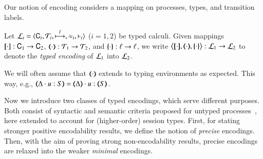 \noi Our notion of encoding considers a mapping on processes, 
types, and transition labels.  

\begin{definition}\rm
        Let  $\mathcal{L}_i=\langle \mathsf{C}_i, {\cal{T}}_i, \stackrel{\ell}{\longmapsto}, \approx_i, \vdash_i \rangle$
        ($i=1,2$) be typed calculi. 
	Given mappings $[\!\![\cdot]\!\!]: \mathsf{C}_1 \to \mathsf{C}_2$, 
	$(\!\!\langle\cdot\rangle\!\!): {\cal{T}}_1 \to {\cal{T}}_2$, and 
	$\{\!\!\{\cdot\}\!\!\}: \ell \to \ell$, 
	we write 
	$\enco{\map{\cdot}, \mapt{\cdot}, \mapa{\cdot}} : \tyl{L}_1 \to \tyl{L}_2$ to denote the \emph{typed encoding} of $\mathcal{L}_1$ into $\mathcal{L}_2$.
\end{definition}

\smallskip 


%


\noi We will often assume that  $(\!\!\langle\cdot\rangle\!\!)$ extends to typing
environments as expected. This way, e.g., $\mapt{\Delta \cat u:S} = \mapt{\Delta} \cat u:\mapt{S}$.

Now we introduce two classes of typed encodings, which 
serve different purposes. Both  consist of syntactic and semantic criteria 
proposed for untyped processes~\cite{Palamidessi03,DBLP:journals/iandc/Gorla10,DBLP:conf/icalp/LanesePSS10}, here extended to account for (higher-order) session types.
First, for stating stronger positive encodability results, 
we define the notion of {\em precise} encodings.
Then, 
with the aim of proving strong non-encodability results, 
precise encodings are relaxed into the weaker {\em minimal} encodings. 


